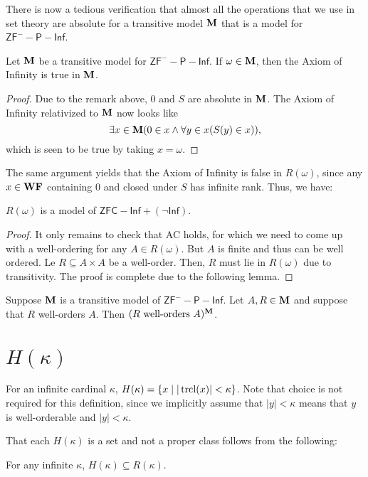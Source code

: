 \begin{remark}
    There is now a tedious verification that almost all the operations that we use in set theory are absolute for a transitive model $\mathbf{M}$ that is a model for $\mathsf{ZF}^- - \mathsf P - \mathsf{Inf}$.
\end{remark}

\begin{lemma}
    Let $\mathbf{M}$ be a transitive model for $\mathsf{ZF}^- - \mathsf P - \mathsf{Inf}$. If $\omega\in\mathbf{M}$, then the Axiom of Infinity is true in $\mathbf{M}$. 
\end{lemma}
\begin{proof}
    Due to the remark above, $0$ and $S$ are absolute in $\mathbf{M}$. The Axiom of Infinity relativized to $\mathbf{M}$ now looks like 
    \begin{equation*}
        \exists x\in\mathbf{M}(0\in x\wedge\forall y\in x(S(y)\in x)),
    \end{equation*}
    which is seen to be true by taking $x = \omega$.
\end{proof}

The same argument yields that the Axiom of Infinity is false in $R(\omega)$, since any $x\in\mathbf{WF}$ containing $0$ and closed under $S$ has infinite rank. Thus, we have:

\begin{theorem}
    $R(\omega)$ is a model of $\mathsf{ZFC} - \mathsf{Inf} + (\neg\mathsf{Inf})$.
\end{theorem}
\begin{proof}
    It only remains to check that AC holds, for which we need to come up with a well-ordering for any $A\in R(\omega)$. But $A$ is finite and thus can be well ordered. Le $R\subseteq A\times A$ be a well-order. Then, $R$ must lie in $R(\omega)$ due to transitivity. The proof is complete due to the following lemma.
\end{proof}

\begin{lemma}
    Suppose $\mathbf{M}$ is a transitive model of $\mathsf{ZF}^- - \mathsf P - \mathsf{Inf}$. Let $A, R\in\mathbf{M}$ and suppose that $R$ well-orders $A$. Then $(R\text{ well-orders }A)^{\mathbf{M}}$.
\end{lemma}

\section{\texorpdfstring{$H(\kappa)$}{H(k)}}

\begin{definition}
    For an infinite cardinal $\kappa$, $H(\kappa) = \{x\mid|\operatorname{tr cl}(x)| < \kappa\}$. Note that choice is not required for this definition, since we implicitly assume that $|y| < \kappa$ means that $y$ is well-orderable and $|y| < \kappa$.
\end{definition}

That each $H(\kappa)$ is a set and not a proper class follows from the following: 
\begin{theorem}
    For any infinite $\kappa$, $H(\kappa)\subseteq R(\kappa)$.
\end{theorem}